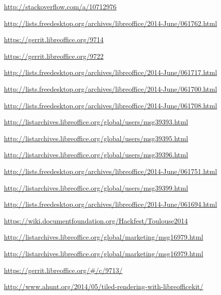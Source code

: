 \documentclass{article}
\begin{document}
\begin{thebibliography}{30}
\url{http://stackoverflow.com/a/10712976}

\url{http://lists.freedesktop.org/archives/libreoffice/2014-June/061762.html}

\url{https://gerrit.libreoffice.org/9714}

\url{https://gerrit.libreoffice.org/9722}

\url{http://lists.freedesktop.org/archives/libreoffice/2014-June/061717.html}

\url{http://lists.freedesktop.org/archives/libreoffice/2014-June/061700.html}

\url{http://lists.freedesktop.org/archives/libreoffice/2014-June/061708.html}

\url{http://listarchives.libreoffice.org/global/users/msg39393.html}

\url{http://listarchives.libreoffice.org/global/users/msg39395.html}

\url{http://listarchives.libreoffice.org/global/users/msg39396.html}

\url{http://lists.freedesktop.org/archives/libreoffice/2014-June/061751.html}

\url{http://listarchives.libreoffice.org/global/users/msg39399.html}

\url{http://lists.freedesktop.org/archives/libreoffice/2014-June/061694.html}

\url{https://wiki.documentfoundation.org/Hackfest/Toulouse2014}

\url{http://listarchives.libreoffice.org/global/marketing/msg16979.html}

\url{http://listarchives.libreoffice.org/global/marketing/msg16979.html}

\url{https://gerrit.libreoffice.org/#/c/9713/}

\url{http://www.ahunt.org/2014/05/tiled-rendering-with-libreofficekit/}

\end{thebibliography}
\end{document}
